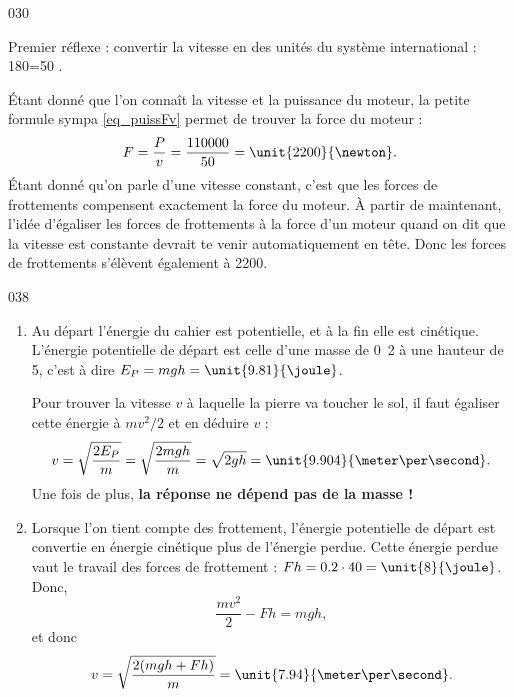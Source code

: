 \documentclass{article}
\begin{document}
\begin{corrige}{030}

Premier réflexe : convertir la vitesse en des unités du système international : \unit{180}{\kilo\meter\per\hour}=\unit{50}{ \meter\per\second}.

Étant donné que l'on connaît la vitesse et la puissance du moteur, la \og petite formule sympa\fg{} \eqref{eq_puissFv} permet de trouver la force du moteur :
\[ 
  F=\frac{ P }{ v }=\frac{ 110000 }{ 50 }=\unit{2200}{\newton}.
\]
Étant donné qu'on parle d'une vitesse constant, c'est que les forces de frottements compensent exactement la force du moteur. À partir de maintenant, l'idée d'égaliser les forces de frottements à la force d'un moteur quand on dit que la vitesse est constante devrait te venir automatiquement en tête. Donc les forces de frottements s'élèvent également à \unit{2200}{\newton}.

\end{corrige}


\begin{corrige}{038}
\begin{enumerate}

\item Au départ l'énergie du cahier est potentielle, et à la fin elle est cinétique. L'énergie potentielle de départ est celle d'une masse de \unit{0.2}{\kilo\gram} à une hauteur de \unit{5}{\meter}, c'est à dire $E_P=mgh=\unit{9.81}{\joule}$. 

Pour trouver la vitesse $v$ à laquelle la pierre va toucher le sol, il faut égaliser cette énergie à $mv^2/2$ et en déduire $v$ :
\[ 
  v=\sqrt{ \frac{ 2E_P }{ m } }=\sqrt{\frac{ 2mgh }{ m }}=\sqrt{2gh}=\unit{9.904}{\meter\per\second}.
\]
Une fois de plus, {\bf la réponse ne dépend  pas de la masse !}


\item  Lorsque l'on tient compte des frottement, l'énergie potentielle de départ est convertie en énergie cinétique plus de l'énergie perdue. Cette énergie perdue vaut le travail des forces de frottement : $Fh=0.2\cdot 40=\unit{8}{\joule}$. Donc,
\[ 
  \frac{ mv^2 }{ 2 }-Fh=mgh,
\]
et donc
\[ 
  v=\sqrt{  \frac{ 2(mgh+Fh) }{ m }  }=\unit{7.94}{ \meter\per\second}.
\]

\end{enumerate}


\end{corrige}
\end{document}
